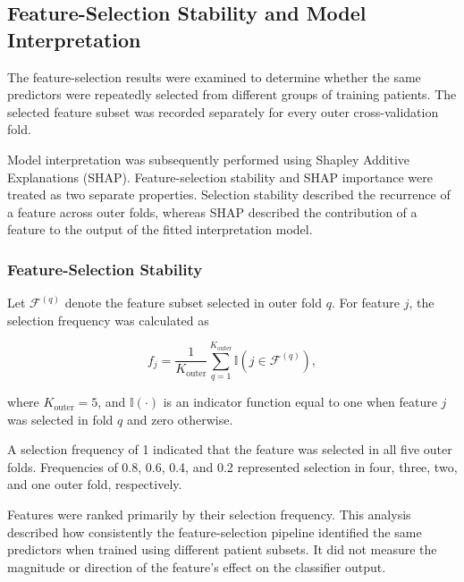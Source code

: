 \documentclass[12pt,twocolumn]{article}
\begin{document}
\subsection{Feature-Selection Stability and Model Interpretation}
\label{subsec:stability_interpretation}

The feature-selection results were examined to determine whether the
same predictors were repeatedly selected from different groups of
training patients. The selected feature subset was recorded separately
for every outer cross-validation fold.

Model interpretation was subsequently performed using Shapley
Additive Explanations (SHAP). Feature-selection stability and SHAP
importance were treated as two separate properties. Selection
stability described the recurrence of a feature across outer folds,
whereas SHAP described the contribution of a feature to the output of
the fitted interpretation model.






\subsubsection{Feature-Selection Stability}
\label{subsubsec:feature_selection_stability}

Let \(\mathcal{F}^{(q)}\) denote the feature subset selected in outer
fold \(q\). For feature \(j\), the selection frequency was calculated
as

\begin{equation}
f_j
=
\frac{1}{K_{\mathrm{outer}}}
\sum_{q=1}^{K_{\mathrm{outer}}}
\mathbb{I}
\left(
j\in\mathcal{F}^{(q)}
\right),
\label{eq:feature_selection_frequency}
\end{equation}

where \(K_{\mathrm{outer}}=5\), and
\(\mathbb{I}(\cdot)\) is an indicator function equal to one when
feature \(j\) was selected in fold \(q\) and zero otherwise.

A selection frequency of 1 indicated that the feature was selected in
all five outer folds. Frequencies of 0.8, 0.6, 0.4, and 0.2 represented
selection in four, three, two, and one outer fold, respectively.

Features were ranked primarily by their selection frequency. This
analysis described how consistently the feature-selection pipeline
identified the same predictors when trained using different patient
subsets. It did not measure the magnitude or direction of the
feature's effect on the classifier output.
\end{document}
